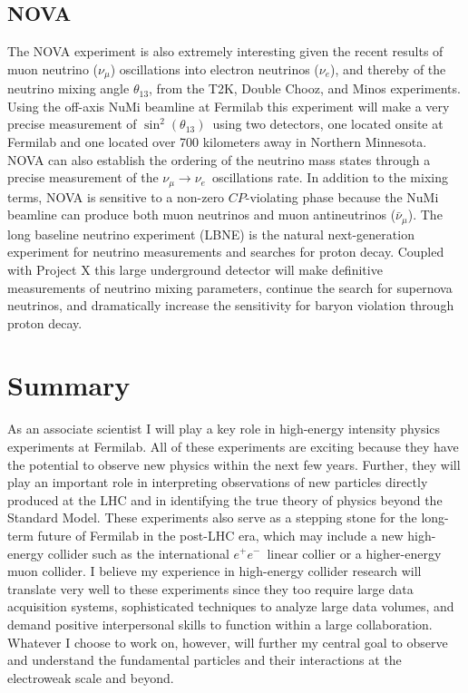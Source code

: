 \documentclass[12pt]{article}
\begin{document}
\subsection{NOVA}
The NOVA experiment is also extremely interesting given the recent results of muon neutrino ($\nu_{\mu}$) oscillations into electron neutrinos ($\nu_{e}$), and thereby of the neutrino mixing angle $\theta_{13}$, from the T2K, Double Chooz, and Minos experiments. Using the off-axis NuMi beamline at Fermilab this experiment will make a very precise measurement of $\sin^{2}(\theta_{13})$~using two detectors, one located onsite at Fermilab and one located over 700 kilometers away in Northern Minnesota. NOVA can also establish the ordering of the neutrino mass states through a precise measurement of the $\nu_{\mu}\rightarrow\nu_{e}$~oscillations rate. In addition to the mixing terms, NOVA is sensitive to a non-zero $CP$-violating phase because the NuMi beamline can produce both muon neutrinos and muon antineutrinos ($\bar{\nu}_{\mu}$). The long baseline neutrino experiment (LBNE) is the natural next-generation experiment for neutrino measurements and searches for proton decay. Coupled with Project X this large underground detector will make definitive measurements of neutrino mixing parameters, continue the search for supernova neutrinos, and dramatically increase the sensitivity for baryon violation through proton decay.

\clearpage
\section{Summary}
As an associate scientist I will play a key role in high-energy intensity physics experiments at Fermilab. All of these experiments are exciting because they have the potential to observe new physics within the next few years. Further, they will play an important role in interpreting observations of new particles directly produced at the LHC and in identifying the true theory of physics beyond the Standard Model. These experiments also serve as a stepping stone for the long-term future of Fermilab in the post-LHC era, which may include a new high-energy collider such as the international $e^{+}e^{-}$~linear collier or a higher-energy muon collider. I believe my experience in high-energy collider research will translate very well to these experiments since they too require large data acquisition systems, sophisticated techniques to analyze large data volumes, and demand positive interpersonal skills to function within a large collaboration. Whatever I choose to work on, however, will further my central goal to observe and understand the fundamental particles and their interactions at the electroweak scale and beyond.
\end{document}
